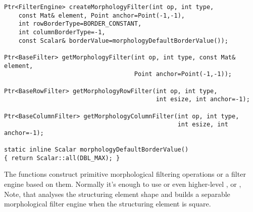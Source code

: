 \begin{lstlisting}
Ptr<FilterEngine> createMorphologyFilter(int op, int type,
    const Mat& element, Point anchor=Point(-1,-1),
    int rowBorderType=BORDER_CONSTANT,
    int columnBorderType=-1,
    const Scalar& borderValue=morphologyDefaultBorderValue());
                   
Ptr<BaseFilter> getMorphologyFilter(int op, int type, const Mat& element,
                                    Point anchor=Point(-1,-1));
                                   
Ptr<BaseRowFilter> getMorphologyRowFilter(int op, int type,
                                          int esize, int anchor=-1);
                                          
Ptr<BaseColumnFilter> getMorphologyColumnFilter(int op, int type,
                                                int esize, int anchor=-1);

static inline Scalar morphologyDefaultBorderValue()
{ return Scalar::all(DBL_MAX); }
\end{lstlisting}
\begin{description}
\end{description}

The functions construct primitive morphological filtering operations or a filter engine based on them. Normally it's enough to use  or even higher-level ,  or , Note, that  analyses the structuring element shape and builds a separable morphological filter engine when the structuring element is square.

